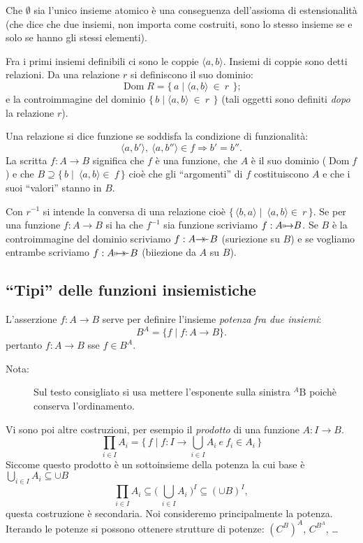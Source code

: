 \documentclass{book}
\newcommand*{\Dom}{\mathop{\mathrm{Dom}}\nolimits}
\def\ddp{\hbox{\kern-.5em\lower.63ex\hbox{${}^\succ$}}}
\def\bijection{\mbox{$\mapstochar\,\mapsto\ddp$}}
\def\surjection{\mbox{$\to\ddp$}}
\def\injection{\mbox{$\mapstochar\,\mapsto$}}
\begin{document}
Che $\emptyset$ sia l'unico insieme atomico \`e una conseguenza dell'assioma
di estensionalit\`a (che dice che due insiemi, non importa come costruiti,
sono lo stesso insieme se e solo se hanno gli stessi elementi).

Fra i primi insiemi definibili ci sono le coppie $\langle a, b \rangle$.
Insiemi di coppie sono detti relazioni. Da una relazione $r$ si definiscono il
suo dominio:
\[
\Dom R = \bigl\{\,a \mid \langle a, b \rangle\ \in\ r\ \,\bigr\};
\]
e la controimmagine del dominio $\bigl\{\,b \mid \langle a, b \rangle\ \in\ 
r\ \,\bigr\}$
(tali oggetti sono definiti \emph{dopo} la relazione $r$).

Una relazione si dice funzione se soddisfa la condizione di funzionalit\`a:
\[
\langle a, b'\rangle ,\ \langle a, b'' \rangle \in f \Longrightarrow b' = b''.
\]
La scritta $f \colon A \to B$ significa che $f$ \`e una funzione, che
$A$ \`e il suo dominio ($\Dom f$) e che $B \supseteq \bigl\{\, b \mid\ \langle
a, b\rangle \in\ f \,\bigr\}$ cio\`e che gli ``argomenti'' di $f$
costituiscono $A$ e che i suoi ``valori'' stanno in $B$.

Con $r^{-1}$ si intende la conversa di una relazione cio\`e $\bigl\{\,
\langle b, a \rangle \mid\ \langle a, b\rangle \in\ r \, \bigr\}$. Se per una
funzione $f\colon A \to B$ si ha che $f^{-1}$ sia funzione scriviamo
$f: A \injection B$.
Se $B$ \`e la controimmagine del dominio scriviamo $f: A \surjection B$
(suriezione su $B$) e se vogliamo entrambe scriviamo $f: A \bijection B$ 
(biiezione da $A$ su $B$).


\subsection{``Tipi'' delle funzioni insiemistiche}
L'asserzione $f: A \longrightarrow B$ serve per definire l'insieme
\emph{potenza fra due insiemi}:
\[
B^{A} = \{ f \mid f\colon A \to B \}.
\]
pertanto $f: A \longrightarrow B$ sse $f \in B^{A}$.
\begin{description}
\item[Nota:] Sul testo consigliato si usa mettere l'esponente sulla
sinistra ${}^{A}\textrm{B}$ poich\`e conserva l'ordinamento.
\end{description}
Vi sono poi altre costruzioni, per esempio il \emph{prodotto}
di una funzione $A: I \longrightarrow B$.
\[
\prod_{i \in I}A_{i} = \biggl\{\,f \mid  f: I \longrightarrow
\bigcup_{i \in I}A_{i}\  e \ f_{i} \in A_{i} \,\biggr\}
\]
Siccome questo prodotto \`e un sottoinsieme della potenza la cui base \`e
$\bigcup_{i \in I}A_{i} \subseteq \cup B$
\[
\prod_{i \in I}A_{i} \subseteq \Biggl(\ \bigcup_{i \in I}A_{i}\ \Biggr)^{I}
\subseteq \left(\cup B\right)^I,
\]
questa costruzione \`e secondaria. Noi consideremo principalmente la potenza.
Iterando le potenze si possono ottenere strutture di potenze: $(C^{B})^A$,
$C^{B^{A}}$, \ldots
\end{document}
